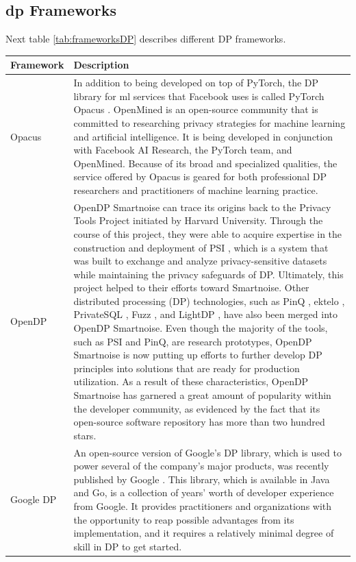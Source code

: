\subsection{\acrshort{dp} Frameworks}

Next table \ref{tab:frameworksDP} describes different DP frameworks.

\begin{longtable}{| p{} | p{} |}
    \hline
    \textbf{Framework} & \textbf{Description} \\
    \hline
    Opacus & In addition to being developed on top of PyTorch, the DP library for \acrshort{ml} services that Facebook uses is called PyTorch Opacus \cite{opacus1}. OpenMined is an open-source community that is committed to researching privacy strategies for machine learning and artificial intelligence. It is being developed in conjunction with Facebook AI Research, the PyTorch team, and OpenMined. Because of its broad and specialized qualities, the service offered by Opacus is geared for both professional DP researchers and practitioners of machine learning practice. \\
    \hline
    OpenDP & OpenDP Smartnoise \cite{opendp1} can trace its origins back to the Privacy Tools Project initiated by Harvard University. Through the course of this project, they were able to acquire expertise in the construction and deployment of PSI \cite{opendp2}, which is a system that was built to exchange and analyze privacy-sensitive datasets while maintaining the privacy safeguards of DP. Ultimately, this project helped to their efforts toward Smartnoise. Other distributed processing (DP) technologies, such as PinQ \cite{opendp3}, ektelo \cite{opendp4}, PrivateSQL \cite{opendp5}, Fuzz \cite{opendp6}, and LightDP \cite{opendp7}, have also been merged into OpenDP Smartnoise. Even though the majority of the tools, such as PSI and PinQ, are research prototypes, OpenDP Smartnoise is now putting up efforts to further develop DP principles into solutions that are ready for production utilization. As a result of these characteristics, OpenDP Smartnoise has garnered a great amount of popularity within the developer community, as evidenced by the fact that its open-source software repository has more than two hundred stars. \\
    \hline
    Google DP & An open-source version of Google's DP library, which is used to power several of the company's major products, was recently published by Google \cite{googledp1}. This library, which is available in Java and Go, is a collection of years' worth of developer experience from Google. It provides practitioners and organizations with the opportunity to reap possible advantages from its implementation, and it requires a relatively minimal degree of skill in DP to get started. \\
   

\end{longtable}
